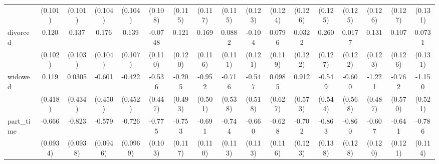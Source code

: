 {\begin{tabular}{l*{16}{c}}
                    &     (0.101)         &     (0.101)         &     (0.104)         &     (0.104)         &     (0.108)         &     (0.115)         &     (0.117)         &     (0.115)         &     (0.123)         &     (0.124)         &     (0.126)         &     (0.125)         &     (0.125)         &     (0.126)         &     (0.127)         &     (0.131)         \\
[1em]
divorced            &       0.120         &       0.137         &       0.176         &       0.139         &     -0.0748         &       0.121         &       0.169         &      0.0882         &      -0.104         &      0.0796         &      0.0322         &       0.260\sym{*}  &      0.0177         &       0.131         &       0.107         &      0.0731         \\
                    &     (0.102)         &     (0.103)         &     (0.104)         &     (0.107)         &     (0.110)         &     (0.120)         &     (0.116)         &     (0.111)         &     (0.121)         &     (0.119)         &     (0.122)         &     (0.127)         &     (0.122)         &     (0.123)         &     (0.126)         &     (0.131)         \\
[1em]
widowed             &       0.119         &      0.0305         &      -0.601         &      -0.422         &      -0.536         &      -0.205         &      -0.952         &      -0.716         &      -0.547         &      0.0985         &       0.912         &      -0.549         &      -0.600         &      -1.221\sym{*}  &      -0.762         &      -1.150\sym{*}  \\
                    &     (0.418)         &     (0.434)         &     (0.450)         &     (0.452)         &     (0.447)         &     (0.493)         &     (0.501)         &     (0.538)         &     (0.518)         &     (0.627)         &     (0.573)         &     (0.544)         &     (0.568)         &     (0.487)         &     (0.570)         &     (0.521)         \\
[1em]
part\_time           &      -0.666\sym{***}&      -0.823\sym{***}&      -0.579\sym{***}&      -0.726\sym{***}&      -0.775\sym{***}&      -0.753\sym{***}&      -0.691\sym{***}&      -0.744\sym{***}&      -0.660\sym{***}&      -0.628\sym{***}&      -0.702\sym{***}&      -0.863\sym{***}&      -0.860\sym{***}&      -0.607\sym{***}&      -0.641\sym{***}&      -0.786\sym{***}\\
                    &    (0.0934)         &    (0.0938)         &    (0.0946)         &    (0.0969)         &     (0.103)         &     (0.117)         &     (0.110)         &     (0.113)         &     (0.113)         &     (0.116)         &     (0.123)         &     (0.138)         &     (0.128)         &     (0.120)         &     (0.121)         &     (0.114)         \\

\end{tabular}}
